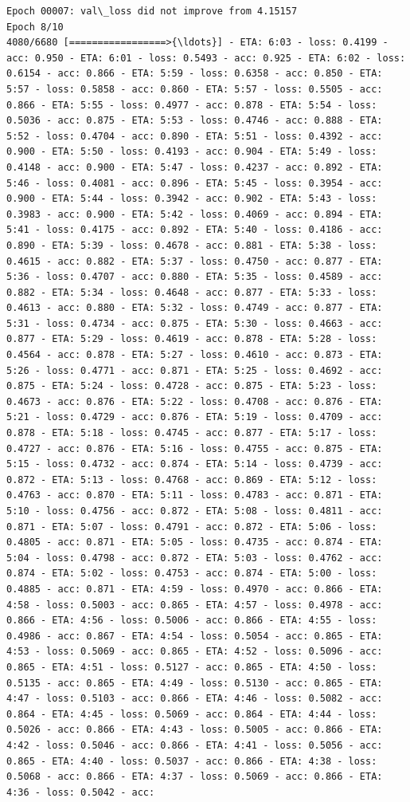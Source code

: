 \documentclass[11pt]{article}
\begin{document}
\begin{Verbatim}[commandchars=\\\{\}]
Epoch 00007: val\_loss did not improve from 4.15157
Epoch 8/10
4080/6680 [=================>{\ldots}] - ETA: 6:03 - loss: 0.4199 - acc: 0.950 - ETA: 6:01 - loss: 0.5493 - acc: 0.925 - ETA: 6:02 - loss: 0.6154 - acc: 0.866 - ETA: 5:59 - loss: 0.6358 - acc: 0.850 - ETA: 5:57 - loss: 0.5858 - acc: 0.860 - ETA: 5:57 - loss: 0.5505 - acc: 0.866 - ETA: 5:55 - loss: 0.4977 - acc: 0.878 - ETA: 5:54 - loss: 0.5036 - acc: 0.875 - ETA: 5:53 - loss: 0.4746 - acc: 0.888 - ETA: 5:52 - loss: 0.4704 - acc: 0.890 - ETA: 5:51 - loss: 0.4392 - acc: 0.900 - ETA: 5:50 - loss: 0.4193 - acc: 0.904 - ETA: 5:49 - loss: 0.4148 - acc: 0.900 - ETA: 5:47 - loss: 0.4237 - acc: 0.892 - ETA: 5:46 - loss: 0.4081 - acc: 0.896 - ETA: 5:45 - loss: 0.3954 - acc: 0.900 - ETA: 5:44 - loss: 0.3942 - acc: 0.902 - ETA: 5:43 - loss: 0.3983 - acc: 0.900 - ETA: 5:42 - loss: 0.4069 - acc: 0.894 - ETA: 5:41 - loss: 0.4175 - acc: 0.892 - ETA: 5:40 - loss: 0.4186 - acc: 0.890 - ETA: 5:39 - loss: 0.4678 - acc: 0.881 - ETA: 5:38 - loss: 0.4615 - acc: 0.882 - ETA: 5:37 - loss: 0.4750 - acc: 0.877 - ETA: 5:36 - loss: 0.4707 - acc: 0.880 - ETA: 5:35 - loss: 0.4589 - acc: 0.882 - ETA: 5:34 - loss: 0.4648 - acc: 0.877 - ETA: 5:33 - loss: 0.4613 - acc: 0.880 - ETA: 5:32 - loss: 0.4749 - acc: 0.877 - ETA: 5:31 - loss: 0.4734 - acc: 0.875 - ETA: 5:30 - loss: 0.4663 - acc: 0.877 - ETA: 5:29 - loss: 0.4619 - acc: 0.878 - ETA: 5:28 - loss: 0.4564 - acc: 0.878 - ETA: 5:27 - loss: 0.4610 - acc: 0.873 - ETA: 5:26 - loss: 0.4771 - acc: 0.871 - ETA: 5:25 - loss: 0.4692 - acc: 0.875 - ETA: 5:24 - loss: 0.4728 - acc: 0.875 - ETA: 5:23 - loss: 0.4673 - acc: 0.876 - ETA: 5:22 - loss: 0.4708 - acc: 0.876 - ETA: 5:21 - loss: 0.4729 - acc: 0.876 - ETA: 5:19 - loss: 0.4709 - acc: 0.878 - ETA: 5:18 - loss: 0.4745 - acc: 0.877 - ETA: 5:17 - loss: 0.4727 - acc: 0.876 - ETA: 5:16 - loss: 0.4755 - acc: 0.875 - ETA: 5:15 - loss: 0.4732 - acc: 0.874 - ETA: 5:14 - loss: 0.4739 - acc: 0.872 - ETA: 5:13 - loss: 0.4768 - acc: 0.869 - ETA: 5:12 - loss: 0.4763 - acc: 0.870 - ETA: 5:11 - loss: 0.4783 - acc: 0.871 - ETA: 5:10 - loss: 0.4756 - acc: 0.872 - ETA: 5:08 - loss: 0.4811 - acc: 0.871 - ETA: 5:07 - loss: 0.4791 - acc: 0.872 - ETA: 5:06 - loss: 0.4805 - acc: 0.871 - ETA: 5:05 - loss: 0.4735 - acc: 0.874 - ETA: 5:04 - loss: 0.4798 - acc: 0.872 - ETA: 5:03 - loss: 0.4762 - acc: 0.874 - ETA: 5:02 - loss: 0.4753 - acc: 0.874 - ETA: 5:00 - loss: 0.4885 - acc: 0.871 - ETA: 4:59 - loss: 0.4970 - acc: 0.866 - ETA: 4:58 - loss: 0.5003 - acc: 0.865 - ETA: 4:57 - loss: 0.4978 - acc: 0.866 - ETA: 4:56 - loss: 0.5006 - acc: 0.866 - ETA: 4:55 - loss: 0.4986 - acc: 0.867 - ETA: 4:54 - loss: 0.5054 - acc: 0.865 - ETA: 4:53 - loss: 0.5069 - acc: 0.865 - ETA: 4:52 - loss: 0.5096 - acc: 0.865 - ETA: 4:51 - loss: 0.5127 - acc: 0.865 - ETA: 4:50 - loss: 0.5135 - acc: 0.865 - ETA: 4:49 - loss: 0.5130 - acc: 0.865 - ETA: 4:47 - loss: 0.5103 - acc: 0.866 - ETA: 4:46 - loss: 0.5082 - acc: 0.864 - ETA: 4:45 - loss: 0.5069 - acc: 0.864 - ETA: 4:44 - loss: 0.5026 - acc: 0.866 - ETA: 4:43 - loss: 0.5005 - acc: 0.866 - ETA: 4:42 - loss: 0.5046 - acc: 0.866 - ETA: 4:41 - loss: 0.5056 - acc: 0.865 - ETA: 4:40 - loss: 0.5037 - acc: 0.866 - ETA: 4:38 - loss: 0.5068 - acc: 0.866 - ETA: 4:37 - loss: 0.5069 - acc: 0.866 - ETA: 4:36 - loss: 0.5042 - acc: 
\end{Verbatim}
\end{document}
